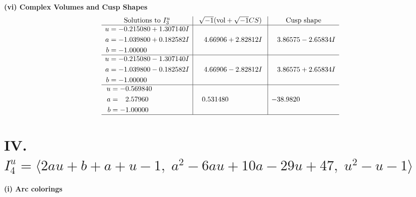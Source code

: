 \documentclass[1p]{elsarticle_modified}
\theoremstyle{definition}
\newcommand{\I}{\sqrt{-1}}
\begin{document}
\newpage\flushleft \textbf{(vi) Complex Volumes and Cusp Shapes}
$$\begin{array}{c|c|c}  
\text{Solutions to }I^u_{3}& \I (\text{vol} + \sqrt{-1}CS) & \text{Cusp shape}\\
 \hline 
\begin{aligned}
u &= -0.215080 + 1.307140 I \\
a &= -1.039800 + 0.182582 I \\
b &= -1.00000\phantom{ +0.000000I}\end{aligned}
 & \phantom{-}4.66906 + 2.82812 I & \phantom{-}3.86575 - 2.65834 I \\ \hline\begin{aligned}
u &= -0.215080 - 1.307140 I \\
a &= -1.039800 - 0.182582 I \\
b &= -1.00000\phantom{ +0.000000I}\end{aligned}
 & \phantom{-}4.66906 - 2.82812 I & \phantom{-}3.86575 + 2.65834 I \\ \hline\begin{aligned}
u &= -0.569840\phantom{ +0.000000I} \\
a &= \phantom{-}2.57960\phantom{ +0.000000I} \\
b &= -1.00000\phantom{ +0.000000I}\end{aligned}
 & \phantom{-}0.531480\phantom{ +0.000000I} & -38.9820\phantom{ +0.000000I}\\
 \hline 
 \end{array}$$\newpage\newpage\renewcommand{\arraystretch}{1}
\centering \section*{IV. $I^u_{4}= \langle 2 a u+b+a+u-1,\;a^2-6 a u+10 a-29 u+47,\;u^2- u-1 \rangle$}
\flushleft \textbf{(i) Arc colorings}\\
\end{document}
